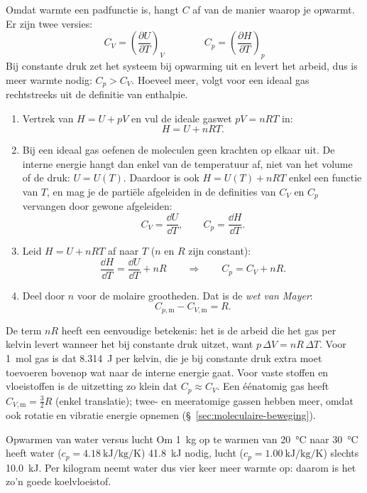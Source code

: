 Omdat warmte een padfunctie is, hangt $C$ af van de manier waarop je opwarmt. Er zijn twee versies:
\begin{equation}
C_V = \left(\frac{\partial U}{\partial T}\right)_V
\qquad\qquad
C_p = \left(\frac{\partial H}{\partial T}\right)_p
\end{equation}
Bij constante druk zet het systeem bij opwarming uit en levert het arbeid, dus is meer warmte nodig: $C_p > C_V$. Hoeveel meer, volgt voor een ideaal gas rechtstreeks uit de definitie van enthalpie.

\begin{enumerate}
\item Vertrek van $H = U + pV$ en vul de ideale gaswet $pV = nRT$ in:
\[
H = U + nRT .
\]
\item Bij een ideaal gas oefenen de moleculen geen krachten op elkaar uit. De interne energie hangt dan enkel van de temperatuur af, niet van het volume of de druk: $U = U(T)$. Daardoor is ook $H = U(T) + nRT$ enkel een functie van $T$, en mag je de parti\"ele afgeleiden in de definities van $C_V$ en $C_p$ vervangen door gewone afgeleiden:
\[
C_V = \frac{\dd U}{\dd T}, \qquad C_p = \frac{\dd H}{\dd T}.
\]
\item Leid $H = U + nRT$ af naar $T$ ($n$ en $R$ zijn constant):
\[
\frac{\dd H}{\dd T} = \frac{\dd U}{\dd T} + nR
\qquad\Longrightarrow\qquad
C_p = C_V + nR .
\]
\item Deel door $n$ voor de molaire grootheden. Dat is de \emph{wet van Mayer}:
\begin{equation}
C_{p,\mathrm{m}} - C_{V,\mathrm{m}} = R .
\label{eq:mayer}
\end{equation}
\end{enumerate}
De term $nR$ heeft een eenvoudige betekenis: het is de arbeid die het gas per kelvin levert wanneer het bij constante druk uitzet, want $p\,\Delta V = nR\,\Delta T$. Voor \SI{1}{\mole} gas is dat \SI{8.314}{\joule} per kelvin, die je bij constante druk extra moet toevoeren bovenop wat naar de interne energie gaat. Voor vaste stoffen en vloeistoffen is de uitzetting zo klein dat $C_p \approx C_V$.
Een \'e\'enatomig gas heeft $C_{V,\mathrm{m}} = \tfrac{3}{2}R$ (enkel translatie); twee- en meeratomige gassen hebben meer, omdat ook rotatie en vibratie energie opnemen (\S~\ref{sec:moleculaire-beweging}).

\begin{voorbeeld}{Opwarmen van water versus lucht}
Om \SI{1}{\kilogram} op te warmen van \SI{20}{\celsius} naar \SI{30}{\celsius} heeft water ($c_p = \SI{4.18}{\kilo\joule\per\kilogram\per\kelvin}$) \SI{41.8}{\kilo\joule} nodig, lucht ($c_p = \SI{1.00}{\kilo\joule\per\kilogram\per\kelvin}$) slechts \SI{10.0}{\kilo\joule}. Per kilogram neemt water dus vier keer meer warmte op: daarom is het zo'n goede koelvloeistof.
\end{voorbeeld}

